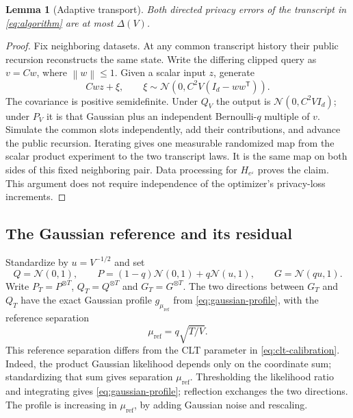 \documentclass[11pt]{article}
\newtheorem{lemma}[theorem]{Lemma}
\newcommand{\N}{\mathcal N}
\newcommand{\norm}[1]{\left\lVert #1\right\rVert}
\begin{document}
\begin{lemma}[Adaptive transport]\label{lem:transport}
Both directed privacy errors of the transcript in \eqref{eq:algorithm}
are at most $\Delta(V)$.
\end{lemma}
\begin{proof}
Fix neighboring datasets. At any common transcript history their public
recursion reconstructs the same state. Write the differing clipped query as
$v=Cw$, where $\norm w\le1$. Given a scalar input $z$, generate
\[
 Cwz+\xi,\qquad \xi\sim\N(0,C^2V(I_d-ww^{\mathsf T})).
\]
The covariance is positive semidefinite. Under $Q_V$ the output is
$\N(0,C^2VI_d)$; under $P_V$ it is that Gaussian plus an independent
Bernoulli-$q$ multiple of $v$. Simulate the common slots independently,
add their contributions, and advance the public recursion. Iterating gives
one measurable randomized map from the scalar product experiment to the
two transcript laws. It is the same map on both sides of this fixed
neighboring pair. Data processing for $H_{e^\varepsilon}$ proves the claim.
This argument does not require independence of the optimizer's privacy-loss
increments.
\end{proof}

\subsection{The Gaussian reference and its residual}
Standardize by $u=V^{-1/2}$ and set
\[
 Q=\N(0,1),\qquad P=(1-q)\N(0,1)+q\N(u,1),\qquad G=\N(qu,1).
\]
Write $P_T=P^{\otimes T}$, $Q_T=Q^{\otimes T}$ and $G_T=G^{\otimes T}$.
The two directions between $G_T$ and $Q_T$ have the exact
Gaussian profile $g_{\mu_{\mathrm{ref}}}$ from \eqref{eq:gaussian-profile}, with the
reference separation
\[
 \mu_{\mathrm{ref}}=q\sqrt{T/V}.
\]
This reference separation differs from the CLT parameter in
\eqref{eq:clt-calibration}.
Indeed, the product Gaussian likelihood depends only on the coordinate sum;
standardizing that sum gives separation $\mu_{\mathrm{ref}}$. Thresholding the likelihood
ratio and integrating gives \eqref{eq:gaussian-profile}; reflection exchanges
the two directions. The profile is increasing in $\mu_{\mathrm{ref}}$, by adding Gaussian
noise and rescaling.
\end{document}
